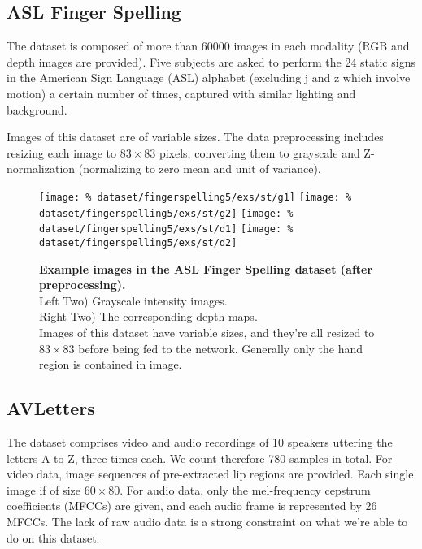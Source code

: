 \subsection{ASL Finger Spelling}

The dataset is composed of more than 60000 images in each modality
(RGB and depth images are provided).
Five subjects are asked to perform the 24 static signs in
the American Sign Language (ASL) alphabet (excluding j and z which involve
motion) a certain number of times, captured with similar lighting
and background.

Images of this dataset are of variable sizes. The data preprocessing
includes resizing each image to $83 \times 83$ pixels,
converting them to grayscale and Z-normalization (normalizing to zero mean
and unit of variance).

\begin{figure}[H]
  \centering
  \hfill
  \texttt{[image: \%
    dataset/fingerspelling5/exs/st/g1]}
  \hfill
  \texttt{[image: \%
    dataset/fingerspelling5/exs/st/g2]}
  \hfill
  \texttt{[image: \%
    dataset/fingerspelling5/exs/st/d1]}
  \hfill
  \texttt{[image: \%
    dataset/fingerspelling5/exs/st/d2]}
  \caption{%
    \textbf{Example images in the ASL Finger Spelling dataset
      (after preprocessing).}\\[0.1em]
    Left Two) Grayscale intensity images.\\[0.1em]
    Right Two) The corresponding depth maps.\\[0.1em]
    Images of this dataset have variable sizes, and they're all resized to
      $83 \times 83$ before being fed to the network. Generally only the
      hand region is contained in image.}
  \label{fig:fingerspelling_exs}
\end{figure}

\subsection{AVLetters}

The dataset comprises video and audio recordings of 10 speakers
uttering the letters A to Z, three times each.
We count therefore 780 samples in total. For video data, image sequences
of pre-extracted lip regions are provided.
Each single image if of size $60 \times 80$.
For audio data, only the mel-frequency cepstrum coefficients (MFCCs)
are given, and each audio frame is represented by 26 MFCCs.
The lack of raw audio data is a strong constraint on what we're able to do
on this dataset.

